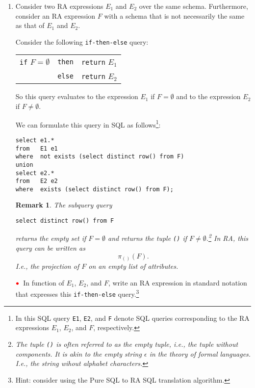 \documentclass[11pt]{article}
\newcommand{\red}[1]{{\color{red}#1}}
\newcommand{\redbullet}{$\red{\bullet}$}
\newtheorem{remark}{Remark}
\begin{document}
\begin{enumerate}[resume]

\item\label{IfThenElse} Consider two RA expressions $E_1$ and $E_2$ over the
same schema.   Furthermore, consider an RA expression $F$ with
a schema that is not necessarily the same as that of $E_1$ and
$E_2$.

Consider the following {\tt if-then-else} query:

\begin{center}
\begin{tabular}{lll}
{\tt if} $F = \emptyset$ &{\tt then}& {\tt return} $E_1$ \\
& {\tt else}& {\tt return} $E_2$
\end{tabular}
\end{center}

So this query evaluates to the expression $E_1$ if $F= \emptyset$
and to the expression $E_2$ if $F \neq \emptyset$.

We can formulate this query in SQL as follows\footnote{In this SQL query
{\tt E1}, {\tt E2}, and {\tt F} denote  SQL queries corresponding to the
RA expressions $E_1$, $E_2$, and $F$, respectively.}:

{\footnotesize
\begin{verbatim}
select e1.*
from   E1 e1
where  not exists (select distinct row() from F)
union
select e2.*
from   E2 e2
where  exists (select distinct row() from F);
\end{verbatim}}

\begin{remark}
The subquery query 
{\footnotesize
\begin{verbatim}
select distinct row() from F
\end{verbatim}}
returns the empty set if $F=\emptyset$ and
returns the tuple {\tt ()} if $F\neq \emptyset$.\footnote{The tuple {\tt ()} is often referred to as the \emph{empty tuple}, i.e., the tuple without components. It is akin
to the empty string $\epsilon$ in the theory of formal languages. I.e., the string wihout alphabet characters.}
In RA, this query can be written as $$\pi_{()}(F).$$
I.e., the projection of $F$ on an empty list of attributes.
\end{remark}


\redbullet\ In function of $E_1$, $E_2$, and $F$, write an RA expression in standard notation that
expresses this {\tt if-then-else} query.\footnote{Hint: consider using the Pure SQL to RA SQL translation algorithm.}



\end{enumerate}
\end{document}
